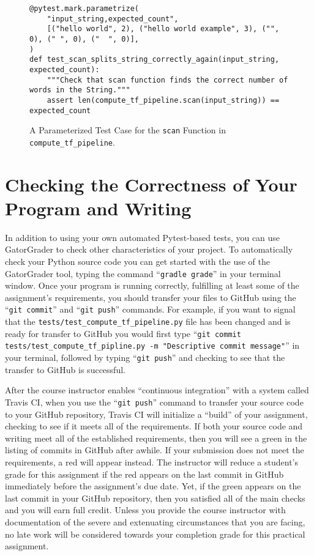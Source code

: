 \documentclass[11pt]{article}
\newcommand{\testprogramsource}{\lstinline{tests/test_compute_tf_pipeline.py}}
\newcommand{\gatorgraderstart}{\command{gradle grade}}
\newcommand{\gitcommit}{\command{git commit}}
\newcommand{\gitpush}{\command{git push}}
\newcommand{\gitcommittestprogram}{\command{git commit tests/test_compute_tf_pipline.py -m "Descriptive commit message"}}
\newcommand{\command}[1]{``\lstinline{#1}''}
\newcommand{\step}[1]{``{#1}''}
\newcommand{\checkmark}{\ding{51}}
\newcommand{\naughtmark}{\ding{55}}
\begin{document}
\begin{figure}[t]

\begin{verbatim}
@pytest.mark.parametrize(
    "input_string,expected_count",
    [("hello world", 2), ("hello world example", 3), ("", 0), (" ", 0), ("  ", 0)],
)
def test_scan_splits_string_correctly_again(input_string, expected_count):
    """Check that scan function finds the correct number of words in the String."""
    assert len(compute_tf_pipeline.scan(input_string)) == expected_count
\end{verbatim}

\caption{A Parameterized Test Case for the {\tt scan} Function in {\tt compute\_tf\_pipeline}.}\label{fig:param}

\end{figure}

\section*{Checking the Correctness of Your Program and Writing}

In addition to using your own automated Pytest-based tests, you can use
GatorGrader to check other characteristics of your project. To automatically
check your Python source code you can get started with the use of the
GatorGrader tool, typing the command \gatorgraderstart{} in your terminal
window.
%
Once your program is running correctly, fulfilling at least some of the
assignment's requirements, you should transfer your files to GitHub using the
\gitcommit{} and \gitpush{} commands. For example, if you want to signal that
the \testprogramsource{} file has been changed and is ready for transfer to
GitHub you would first type \gitcommittestprogram{} in your terminal, followed
by typing \gitpush{} and checking to see that the transfer to GitHub is
successful.

After the course instructor enables \step{continuous integration} with a system
called Travis CI, when you use the \gitpush{} command to transfer your source
code to your GitHub repository, Travis CI will initialize a \step{build} of your
assignment, checking to see if it meets all of the requirements. If both your
source code and writing meet all of the established requirements, then you will
see a green \checkmark{} in the listing of commits in GitHub after awhile. If
your submission does not meet the requirements, a red \naughtmark{} will appear
instead. The instructor will reduce a student's grade for this assignment if the
red \naughtmark{} appears on the last commit in GitHub immediately before the
assignment's due date. Yet, if the green \checkmark{} appears on the last commit
in your GitHub repository, then you satisfied all of the main checks and you
will earn full credit. Unless you provide the course instructor with
documentation of the severe and extenuating circumstances that you are facing,
no late work will be considered towards your completion grade for this practical
assignment.
\end{document}
